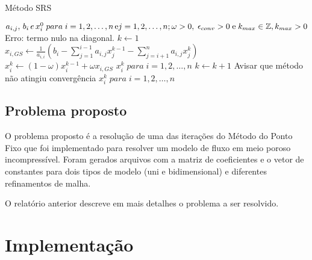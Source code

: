 \documentclass[final,5p]{elsarticle}
\numberwithin{equation}{section}
\begin{document}
        \begin{algorithm}
            \caption{Método SRS}\label{alg:srs}
            \begin{algorithmic}
                \Require $a_{i,j},\,b_i\,e\, x_i^0\; para \; i=1,2,\ldots,n\,\text{e}\\j=1,2,\ldots,n;\\\omega > 0,\; \epsilon_{conv} > 0\;\text{e}\; k_{max} \in \mathbb{Z}, k_{max} > 0$
                        \State \Return Erro: termo nulo na diagonal.
                    \EndIf
                \EndFor
                \State $k \gets 1$
                        \State $x_{i,GS} \gets \frac{1}{a_{i,i}} \left( b_i - \sum^{i-1}_{j=1} a_{i,j} x_j^{k-1} - \sum^{n}_{j=i+1} a_{i,j} x_j^{k} \right)$
                        \State $x_i^k \gets (1 - \omega) x_i^{k-1} + \omega x_{i,GS}$
                    \EndFor
                        \State \Return $x_i^k \; para \; i=1,2,\ldots,n$
                    \EndIf
                    \State $k \gets k+1$
                \EndWhile
                \State Avisar que método não atingiu convergência
                \State \Return $x_i^k \; para \; i=1,2,\ldots,n$
            \end{algorithmic}
        \end{algorithm}

    \subsection{Problema proposto}

        O problema proposto é a resolução de uma das iterações do Método do Ponto Fixo que foi implementado para resolver um modelo de fluxo em meio poroso incompressível. Foram gerados arquivos com a matriz de coeficientes e o vetor de constantes para dois tipos de modelo (uni e bidimensional) e diferentes refinamentos de malha.

        O relatório anterior\cite{relatoriogauss} descreve em mais detalhes o problema a ser resolvido.

\section{Implementação} \label{sec:implementacao}
\end{document}
